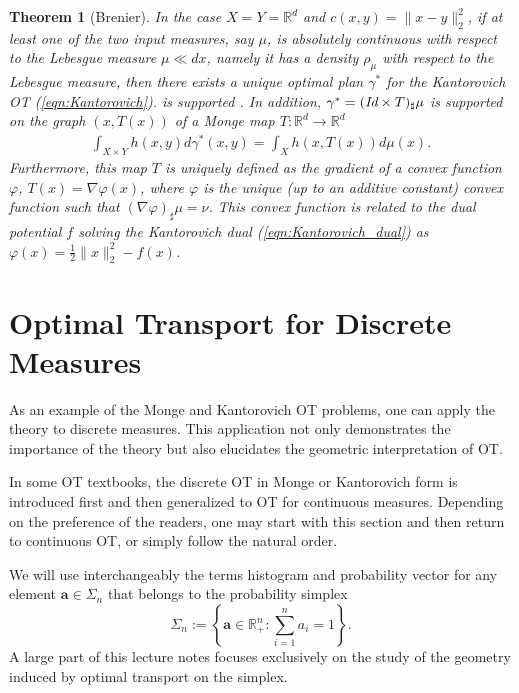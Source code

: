 \documentclass[11pt]{book}
\newtheorem{theorem}{Theorem}[section]
\begin{document}
\begin{theorem}[Brenier]
In the case \( X = Y = \mathbb{R}^d \) and \( c(x, y) = \|x - y\|_2^2 \), if at least one of the two input measures, say $\mu$, is absolutely continuous with respect to the Lebesgue measure $\mu \ll dx$, namely it has a density \(\rho_{\mu}\) with respect to the Lebesgue measure, then there exists a unique optimal plan $\gamma^*$ for the Kantorovich OT (\ref{eqn:Kantorovich}).  is supported . In addition, $\gamma^* = (\emph{Id} \times T)_\sharp \mu$ is supported on the graph \((x, T(x))\) of a Monge map \( T: \mathbb{R}^d \rightarrow \mathbb{R}^d \)
\begin{align}
\int_{X \times Y} h(x, y) d\gamma^*(x, y) = \int_X h(x, T(x)) d\mu(x). 
\end{align}
Furthermore, this map \( T \) is uniquely defined as the gradient of a convex function \(\varphi\), \( T(x) = \nabla \varphi(x) \), where \(\varphi\) is the unique (up to an additive constant) convex function such that \( (\nabla \varphi)_\sharp \mu = \nu \). This convex function is related to the dual potential \( f \) solving the Kantorovich dual (\ref{eqn:Kantorovich_dual}) as \(\varphi(x) = \frac{1}{2} \|x\|_2^2 - f(x)\).
\end{theorem}






\section[Discrete OT]{Optimal Transport for Discrete Measures}

As an example of the Monge and Kantorovich OT problems, one can apply the theory to discrete measures. This application not only demonstrates the importance of the theory but also elucidates the geometric interpretation of OT.

In some OT textbooks, the discrete OT in Monge or Kantorovich form is introduced first and then generalized to OT for continuous measures. Depending on the preference of the readers, one may start with this section and then return to continuous OT, or simply follow the natural order.


We will use interchangeably the terms histogram and probability vector for any element \(\mathbf{a} \in \Sigma_n\) that belongs to the probability simplex
\[
\Sigma_n := \left\{ \mathbf{a} \in \mathbb{R}^n_+ : \sum_{i=1}^n a_i = 1 \right\}.
\]
A large part of this lecture notes focuses exclusively on the study of the geometry induced by optimal transport on the simplex.
\end{document}
